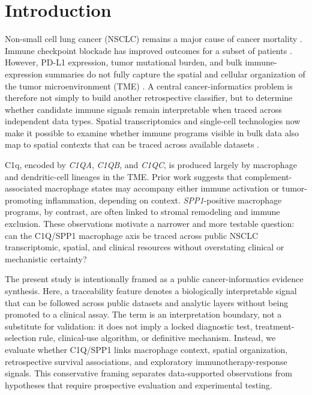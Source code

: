 \documentclass[pdflatex,sn-mathphys-num,referee,lineno]{sn-jnl}
\theoremstyle{thmstyleone}%
\theoremstyle{thmstyletwo}%
\theoremstyle{thmstylethree}%
\begin{document}
\maketitle

\section{Introduction}\label{sec:intro}

Non-small cell lung cancer (NSCLC) remains a major cause of cancer mortality \cite{sungGlobalCancerStatistics2021b, chenNonsmallcellLungCancers2014, reckPembrolizumabChemotherapyPDL1positive2016}. Immune checkpoint blockade has improved outcomes for a subset of patients \cite{herbstAtezolizumabFirstlineTreatment2020, gandhiPembrolizumabChemotherapyMetastatic2018}. However, PD-L1 expression, tumor mutational burden, and bulk immune-expression summaries do not fully capture the spatial and cellular organization of the tumor microenvironment (TME) \cite{marabelleAssociationTumourMutational2020, topalianMechanismdrivenBiomarkersGuide2016}. A central cancer-informatics problem is therefore not simply to build another retrospective classifier, but to determine whether candidate immune signals remain interpretable when traced across independent data types. Spatial transcriptomics and single-cell technologies now make it possible to examine whether immune programs visible in bulk data also map to spatial contexts that can be traced across available datasets \cite{stahlVisualizationAnalysisGene2016, marxMethodYearSpatially2021, zilionisSinglecellTranscriptomicsHuman2019}.

C1q, encoded by \textit{C1QA}, \textit{C1QB}, and \textit{C1QC}, is produced largely by macrophage and dendritic-cell lineages in the TME. Prior work suggests that complement-associated macrophage states may accompany either immune activation or tumor-promoting inflammation, depending on context. \textit{SPP1}-positive macrophage programs, by contrast, are often linked to stromal remodeling and immune exclusion. These observations motivate a narrower and more testable question: can the C1Q/SPP1 macrophage axis be traced across public NSCLC transcriptomic, spatial, and clinical resources without overstating clinical or mechanistic certainty?

The present study is intentionally framed as a public cancer-informatics evidence synthesis. Here, a traceability feature denotes a biologically interpretable signal that can be followed across public datasets and analytic layers without being promoted to a clinical assay. The term is an interpretation boundary, not a substitute for validation: it does not imply a locked diagnostic test, treatment-selection rule, clinical-use algorithm, or definitive mechanism. Instead, we evaluate whether C1Q/SPP1 links macrophage context, spatial organization, retrospective survival associations, and exploratory immunotherapy-response signals. This conservative framing separates data-supported observations from hypotheses that require prospective evaluation and experimental testing.
\end{document}
